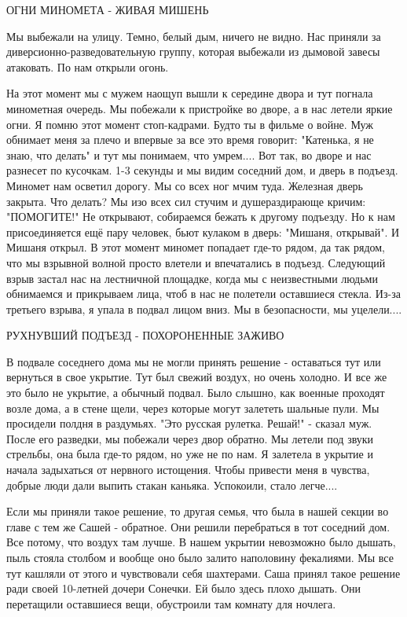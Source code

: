 ОГНИ МИНОМЕТА - ЖИВАЯ МИШЕНЬ

Мы выбежали на улицу. Темно, белый дым, ничего не видно. Нас приняли за
диверсионно-разведовательную группу, которая выбежали из дымовой завесы
атаковать. По нам открыли огонь. 


На этот момент мы с мужем наощуп вышли к середине двора и тут погнала
минометная очередь. Мы побежали к пристройке во дворе, а в нас летели яркие
огни. Я помню этот момент стоп-кадрами. Будто ты в фильме о войне. Муж обнимает
меня за плечо и впервые за все это время говорит: "Катенька, я не знаю, что
делать" и тут мы понимаем, что умрем.... Вот так, во дворе и нас разнесет по
кусочкам. 1-3 секунды и мы видим соседний дом, и дверь в подъезд. Миномет нам
осветил дорогу. Мы со всех ног мчим туда. Железная дверь закрыта. Что делать?
Мы изо всех сил стучим и душераздирающе кричим: "ПОМОГИТЕ!" Не открывают,
собираемся бежать к другому подъезду. Но к нам присоединяется ещё пару человек,
бьют кулаком в дверь: "Мишаня, открывай". И Мишаня открыл. В этот момент
миномет попадает где-то рядом, да так рядом, что мы взрывной волной просто
влетели и впечатались в подъезд. Следующий взрыв застал нас на лестничной
площадке, когда мы с неизвестными людьми обнимаемся и прикрываем лица, чтоб в
нас не полетели оставшиеся стекла. Из-за третьего взрыва, я упала в подвал
лицом вниз. Мы в безопасности, мы уцелели....

РУХНУВШИЙ ПОДЪЕЗД - ПОХОРОНЕННЫЕ ЗАЖИВО

В подвале соседнего дома мы не могли принять решение - оставаться тут или
вернуться в свое укрытие. Тут был свежий воздух, но очень холодно. И все же это
было не укрытие, а обычный подвал. Было слышно, как военные проходят возле
дома, а в стене щели, через которые могут залететь шальные пули. Мы просидели
полдня в раздумьях. "Это русская рулетка. Решай!" - сказал муж. После его
разведки, мы  побежали через двор обратно. Мы летели под звуки стрельбы, она
была где-то рядом, но уже не по нам. Я залетела в укрытие и начала задыхаться
от нервного истощения. Чтобы привести меня в чувства, добрые люди дали выпить
стакан каньяка. Успокоили, стало легче.... 

Если мы приняли такое решение, то другая семья, что была в нашей секции во
главе с тем же Сашей - обратное. Они решили перебраться в тот соседний дом. Все
потому, что воздух там лучше. В нашем укрытии невозможно было дышать, пыль
стояла столбом и вообще оно было залито наполовину фекалиями. Мы все тут
кашляли от этого и чувствовали себя шахтерами. Саша принял такое решение ради
своей 10-летней дочери Сонечки. Ей было здесь плохо дышать. Они перетащили
оставшиеся вещи, обустроили там комнату для ночлега.

